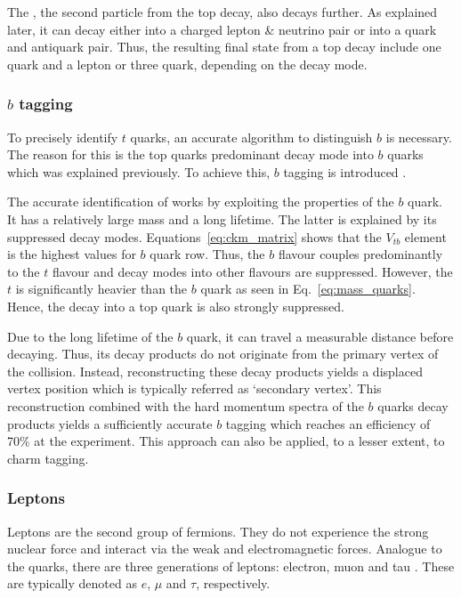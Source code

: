 \documentclass[bachelor,ngerman,english]{GAUBM}
\begin{document}
The \wboson, the second particle from the top decay, also decays further. As explained later, it can decay either into a charged lepton \& neutrino pair or into a quark and antiquark pair. Thus, the resulting final state from a top decay include one quark and a lepton or three quark, depending on the \wboson decay mode. 

\subsubsection*{$b$ tagging}
To precisely identify $t$ quarks, an accurate algorithm to distinguish $b$ is necessary. The reason for this is the top quarks predominant decay mode into $b$ quarks which was explained previously. To achieve this, $b$ tagging is introduced \cite{btag:atlas,btag:cms}.

The accurate identification of works by exploiting the properties of the $b$ quark. It has a relatively large mass and a long lifetime. The latter is explained by its suppressed decay modes. Equations~\ref{eq:ckm_matrix} shows that the $V_{tb}$ element is the highest values for $b$ quark row. Thus, the $b$ flavour couples predominantly to the $t$ flavour and decay modes into other flavours are suppressed. However, the $t$ is significantly heavier than the $b$ quark as seen in Eq.~\ref{eq:mass_quarks}. Hence, the decay into a top quark is also strongly suppressed.

Due to the long lifetime of the $b$ quark, it can travel a measurable distance before decaying. Thus, its decay products do not originate from the primary vertex of the collision. Instead, reconstructing these decay products yields a displaced vertex position which is typically referred as `secondary vertex'. This reconstruction combined with the hard momentum spectra of the $b$ quarks decay products yields a sufficiently accurate $b$ tagging which reaches an efficiency of 70\% \cite{btag:performance} at the \atlas experiment. This approach can also be applied, to a lesser extent, to charm tagging. 


\subsubsection*{Leptons}
Leptons are the second group of fermions. They do not experience the strong nuclear force and interact via the weak and electromagnetic forces. Analogue to the quarks, there are three generations of leptons: electron, muon and tau \cite{theory:general_sm}. These are typically denoted as $e$, $\mu$ and $\tau$, respectively.
\end{document}
